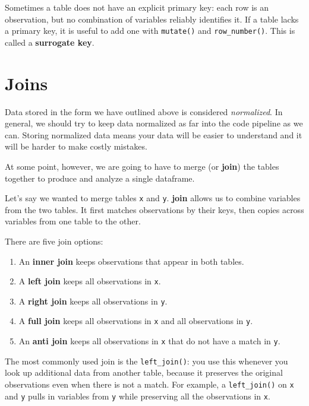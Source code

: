 \documentclass[]{book}
\providecommand{\tightlist}{%
  \setlength{\itemsep}{0pt}\setlength{\parskip}{0pt}}
\begin{document}
Sometimes a table does not have an explicit primary key: each row is an
observation, but no combination of variables reliably identifies it. If
a table lacks a primary key, it is useful to add one with
\texttt{mutate()} and \texttt{row\_number()}. This is called a
\textbf{surrogate key}.

\section{Joins}\label{joins}

Data stored in the form we have outlined above is considered
\emph{normalized}. In general, we should try to keep data normalized as
far into the code pipeline as we can. Storing normalized data means your
data will be easier to understand and it will be harder to make costly
mistakes.

At some point, however, we are going to have to merge (or \textbf{join})
the tables together to produce and analyze a single dataframe.

Let's say we wanted to merge tables \texttt{x} and \texttt{y}.
\textbf{join} allows us to combine variables from the two tables. It
first matches observations by their keys, then copies across variables
from one table to the other.

There are five join options:

\begin{enumerate}
\def\labelenumi{\arabic{enumi}.}
\tightlist
\item
  An \textbf{inner join} keeps observations that appear in both tables.
\item
  A \textbf{left join} keeps all observations in \texttt{x}.
\item
  A \textbf{right join} keeps all observations in \texttt{y}.
\item
  A \textbf{full join} keeps all observations in \texttt{x} and all
  observations in \texttt{y}.
\item
  An \textbf{anti join} keeps all observations in \texttt{x} that do not
  have a match in \texttt{y}.
\end{enumerate}

The most commonly used join is the \texttt{left\_join()}: you use this
whenever you look up additional data from another table, because it
preserves the original observations even when there is not a match. For
example, a \texttt{left\_join()} on \texttt{x} and \texttt{y} pulls in
variables from \texttt{y} while preserving all the observations in
\texttt{x}.
\end{document}
